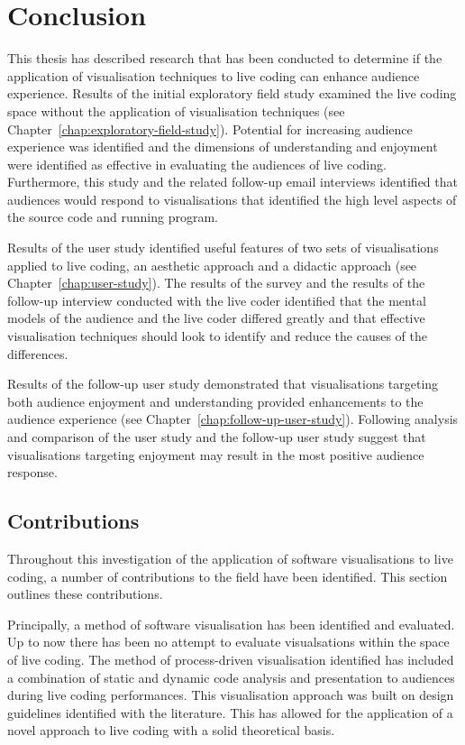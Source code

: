 
\chapter{Conclusion}
\label{chap:conclusion}

This thesis has described research that has been conducted to determine if the application of visualisation techniques to live coding can enhance audience experience. Results of the initial exploratory field study examined the live coding space without the application of visualisation techniques (see Chapter~\ref{chap:exploratory-field-study}). Potential for increasing audience experience was identified and the dimensions of understanding and enjoyment were identified as effective in evaluating the audiences of live coding. Furthermore, this study and the related follow-up email interviews identified that audiences would respond to visualisations that identified the high level aspects of the source code and running program.

Results of the user study identified useful features of two sets of visualisations applied to live coding, an aesthetic approach and a didactic approach (see Chapter~\ref{chap:user-study}). The results of the survey and the results of the follow-up interview conducted with the live coder identified that the mental models of the audience and the live coder differed greatly and that effective visualisation techniques should look to identify and reduce the causes of the differences.

Results of the follow-up user study demonstrated that visualisations targeting  both audience enjoyment and understanding provided enhancements to the audience experience (see Chapter~\ref{chap:follow-up-user-study}). Following analysis and comparison of the user study and the follow-up user study suggest that visualisations targeting enjoyment may result in the most positive audience response.

\section{Contributions}

Throughout this investigation of the application of software visualisations to live coding, a number of contributions to the field have been identified. This section outlines these contributions.

Principally, a method of software visualisation has been identified and evaluated. Up to now there has been no attempt to evaluate visualsations within the space of live coding. The method of process-driven visualisation identified has included a combination of static and dynamic code analysis and presentation to audiences during live coding performances. This visualisation approach was built on design guidelines identified with the literature. This has allowed for the application of a novel approach to live coding with a solid theoretical basis.

